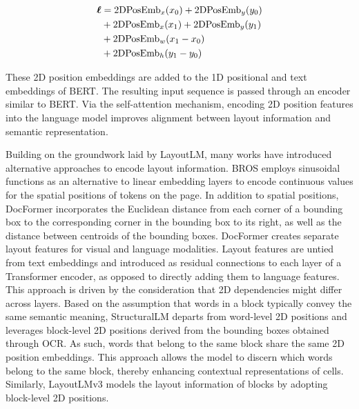 \begin{equation}
\begin{split}
    \boldsymbol{\ell} & = \text{2DPosEmb}_x(x_0) + \text{2DPosEmb}_y(y_0) \\
    & + \text{2DPosEmb}_x(x_1) + \text{2DPosEmb}_y(y_1) \\
    & + \text{2DPosEmb}_w(x_1 - x_0) \\
    & + \text{2DPosEmb}_h(y_1 - y_0) \\
\end{split}
\end{equation}

\noindent These 2D position embeddings are added to the 1D positional and text embeddings of \ac{BERT}. The resulting input sequence is passed through an encoder similar to \ac{BERT}. Via the self-attention mechanism, encoding 2D position features into the language model improves alignment between layout information and semantic representation. 

Building on the groundwork laid by LayoutLM, many works have introduced alternative approaches to encode layout information. BROS \citep{hong2020bros} employs sinusoidal functions as an alternative to linear embedding layers to encode continuous values for the spatial positions of tokens on the page. In addition to spatial positions, DocFormer \citep{appalaraju2021docformer} incorporates the Euclidean distance from each corner of a bounding box to the corresponding corner in the bounding box to its right, as well as the distance between centroids of the bounding boxes. DocFormer creates separate layout features for visual and language modalities. Layout features are untied from text embeddings and introduced as residual connections to each layer of a Transformer encoder, as opposed to directly adding them to language features. This approach is driven by the consideration that 2D dependencies might differ across layers. Based on the assumption that words in a block typically convey the same semantic meaning, StructuralLM \citep{li2021structurallm} departs from word-level 2D positions and leverages block-level 2D positions derived from the bounding boxes obtained through \ac{OCR}. As such, words that belong to the same block share the same 2D position embeddings. This approach allows the model to discern which words belong to the same block, thereby enhancing contextual representations of cells. Similarly, LayoutLMv3 \citep{huang2022layoutlmv3} models the layout information of blocks by adopting block-level 2D positions.



